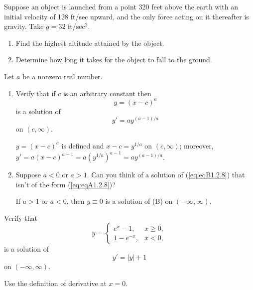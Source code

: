 \documentclass{ximera}
\begin{document}
\begin{problem}\label{exer:1.2.7}
Suppose an object is launched from a point 320 feet
above the earth with an initial velocity of 128 ft/sec
upward, and  the only force acting on it thereafter is
gravity. Take $g=32$ ft/sec$^2$.

\begin{enumerate}
\item %
Find the highest altitude attained by the object.

\item %
Determine how long it takes for the object to fall to the
ground.
\end{enumerate}
\end{problem}

\begin{problem}\label{exer:1.2.8}

Let $a$ be a nonzero real number.
\begin{enumerate}
\item %
Verify that if $c$ is an arbitrary constant then
\begin{equation}\label{eq:eqA1.2.8}
y=(x-c)^a 
\end{equation}
is a solution of
\begin{equation}\label{eq:eqB1.2.8}
y'=ay^{(a-1)/a}
\end{equation}
on $(c,\infty)$.



\begin{solution}
    $y=(x-c)^a$ is defined and  $x-c=y^{1/a}$ on $(c,\infty)$;
moreover, $y'=a(x-c)^{a-1}=a\left(y^{1/a}\right)^{a-1}=ay^{(a-1)/a}$.
\end{solution}

\item %
Suppose $a<0$ or $a>1$. Can you think of a solution of
(\ref{eq:eqB1.2.8}) that isn't of the form (\ref{eq:eqA1.2.8})?



\begin{solution}
    If $a>1$ or $a<0$, then $y\equiv0$  is a solution of
(B) on $(-\infty,\infty)$.
\end{solution}
\end{enumerate}
\end{problem}

\begin{problem}\label{exer:1.2.9}
Verify that
$$
y=
\left\{ \begin{array}{cl}
e^x-1,& x \ge 0, \\
1-e^{-x},& x < 0, \end{array}\right.
$$
is a solution of
$$
y'=|y|+1
$$
on $(-\infty,\infty)$. 
\begin{hint}Use the definition of derivative
at $x=0$.
\end{hint}
\end{problem}
\end{document}

